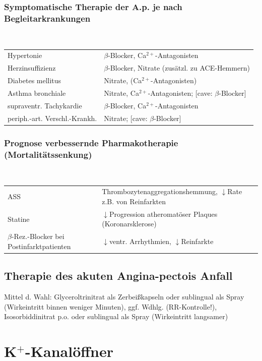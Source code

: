\documentclass[10pt,a4paper]{report}
\begin{document}
\subsubsection{Symptomatische Therapie der A.p. je nach Begleitarkrankungen} \mbox{} \\

\begin{tabularx}{\textwidth}{XX}
Hypertonie&$\beta$-Blocker, Ca$^{2+}$-Antagonisten\\
Herzinsuffizienz&$\beta$-Blocker, Nitrate (zusätzl. zu ACE-Hemmern)\\
Diabetes mellitus&Nitrate, (Ca$^{2+}$-Antagonisten)\\
Asthma bronchiale&Nitrate, Ca$^{2+}$-Antagonisten; [cave: $\beta$-Blocker]\\
supraventr. Tachykardie&$\beta$-Blocker, Ca$^{2+}$-Antagonisten\\
periph.-art. Verschl.-Krankh.&Nitrate; [cave: $\beta$-Blocker]\\
\end{tabularx}

\subsubsection{Prognose verbessernde Pharmakotherapie (Mortalitätssenkung)} \mbox{} \\


\begin{tabularx}{\textwidth}{XX}
ASS&Thrombozytenaggregationshemmung,  $\downarrow$Rate z.B. von Reinfarkten \\
Statine&$\downarrow$Progression atheromatöser Plaques (Koronarsklerose)\\
$\beta$-Rez.-Blocker bei Postinfarktpatienten& $\downarrow$ventr. Arrhythmien, $\downarrow$Reinfarkte\\ 
\end{tabularx}

\subsection{Therapie des akuten Angina-pectois Anfall}

Mittel d. Wahl: Glyceroltrinitrat als Zerbeißkapseln oder sublingual als Spray (Wirkeintritt binnen weniger Minuten), ggf. Wdhlg. (RR-Kontrolle!), Isosorbiddinitrat p.o. oder sublingual als Spray (Wirkeintritt langsamer)

\section{K$^+$-Kanalöffner}
\end{document}
